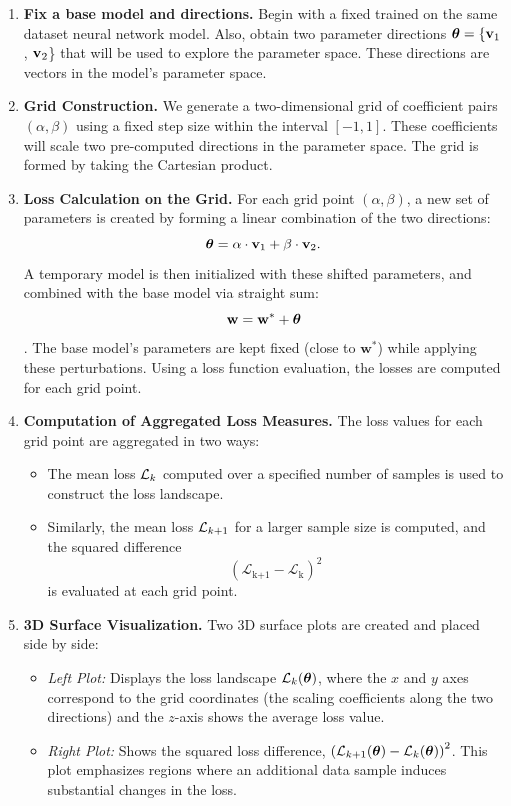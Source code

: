 \documentclass{article}
\begin{document}
\begin{enumerate}
  \item \textbf{Fix a base model and directions.}
        Begin with a fixed trained on the same dataset neural network model.
        Also, obtain two parameter directions $\boldsymbol{\theta} = \{\mathbf{v}_1$, $\mathbf{v}_2$\} that will be used to explore the parameter space.
        These directions are vectors in the model's parameter space.

  \item \textbf{Grid Construction.}
        We generate a two-dimensional grid of coefficient pairs $(\alpha,\beta)$ using a fixed step size within the interval $[-1,1]$.
        These coefficients will scale two pre-computed directions in the parameter space. The grid is formed by taking the Cartesian product.

  \item \textbf{Loss Calculation on the Grid.}
        For each grid point $(\alpha,\beta)$, a new set of parameters is created by forming a linear combination of the two directions:
        $$
          \boldsymbol{\theta} = \alpha\cdot\mathbf{v}_1 + \beta\cdot\mathbf{v}_2.
        $$
        A temporary model is then initialized with these shifted parameters, and combined with the base model via straight sum:
        $$\mathbf{w} = \mathbf{w}^* + \boldsymbol{\theta}$$.
        The base model's parameters are kept fixed (close to $\mathbf{w}^*$) while applying these perturbations.
        Using a loss function evaluation, the losses are computed for each grid point.

  \item \textbf{Computation of Aggregated Loss Measures.}
        The loss values for each grid point are aggregated in two ways:
        \begin{itemize}
          \item The mean loss $\mathcal{L}_k$ computed over a specified number of samples is used to construct the loss landscape.
          \item Similarly, the mean loss $\mathcal{L}_{k+1}$ for a larger sample size is computed, and the squared difference
                $$\left(\mathcal{L}_{\text{k+1}} - \mathcal{L}_{\text{k}}\right)^2$$
                is evaluated at each grid point.
        \end{itemize}

  \item \textbf{3D Surface Visualization.}
        Two 3D surface plots are created and placed side by side:
        \begin{itemize}
          \item \emph{Left Plot:} Displays the loss landscape $\mathcal{L}_{k}(\boldsymbol{\theta})$, where the $x$ and $y$ axes correspond to the grid
                coordinates (the scaling coefficients along the two directions) and the $z$-axis shows the average loss value.
          \item \emph{Right Plot:} Shows the squared loss difference, $\left(\mathcal{L}_{k+1}(\boldsymbol{\theta})-\mathcal{L}_{k}(\boldsymbol{\theta})\right)^2$.
                This plot emphasizes regions where an additional data sample induces substantial changes in the loss.
        \end{itemize}
\end{enumerate}
\end{document}
